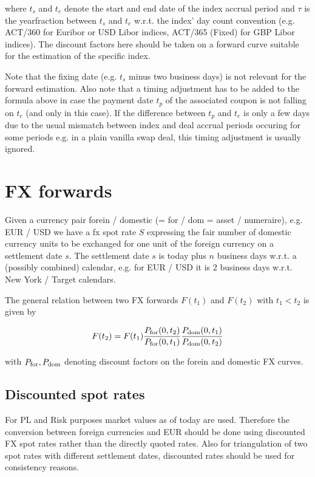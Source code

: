 \documentclass{amsart}
\theoremstyle{plain}
\numberwithin{equation}{section}
\begin{document}
where $t_s$ and $t_e$ denote the start and end date of the index accrual period and $\tau$ is the yearfraction between $t_s$ and $t_e$ w.r.t. the
index' day count convention (e.g. ACT/360 for Euribor or USD Libor indices, ACT/365 (Fixed) for GBP Libor indices). The discount factors here should be taken on
a forward curve suitable for the estimation of the specific index.

Note that the fixing date (e.g. $t_s$ minus two business days) is not relevant for the forward estimation. Also note that a timing adjustment has to be added to the formula above in case the payment date $t_p$ of the associated coupon is not falling on $t_e$ (and only in this case). If the difference between $t_p$ and $t_e$ is only a few days due to the usual mismatch between index and deal accrual periods occuring for some periods e.g. in a plain vanilla swap deal, this timing adjustment is usually ignored.

\section{FX forwards}

Given a currency pair forein / domestic (= for / dom = asset / numeraire), e.g. EUR / USD we have a fx spot rate $S$ expressing the fair number of domestic currency units to be exchanged for one unit of the foreign currency on a settlement date $s$. The settlement date $s$ is today plus $n$ business days w.r.t. a (possibly combined) calendar, e.g. for EUR / USD it is 2 business days w.r.t. New York / Target calendars.

The general relation between two FX forwards $F(t_1)$ and $F(t_2)$ with $t_1<t_2$ is given by

\begin{equation}\label{fxfwd}
F(t_2) = F(t_1) \frac{P_\textnormal{for}(0,t_2)}{P_\textnormal{for}(0,t_1)} \frac{P_\textnormal{dom}(0,t_1)}{P_\textnormal{dom}(0,t_2)}
\end{equation}

with $P_\textnormal{for}, P_\textnormal{dom}$ denoting discount factors on the forein and domestic FX curves.

\subsection{Discounted spot rates}

For PL and Risk purposes market values as of today are used. Therefore the conversion between foreign currencies and EUR should be done using discounted FX spot rates rather than the directly quoted rates.  Also for triangulation of two spot rates with different settlement dates, discounted rates should be used for consistency reasons.
\end{document}
